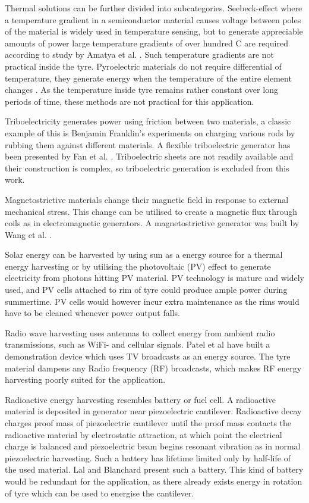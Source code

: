 Thermal solutions can be further divided into subcategories. Seebeck-effect where a temperature gradient in a semiconductor material causes voltage between poles of the material is widely used in temperature sensing, but to generate appreciable amounts of power large temperature gradients of over hundred \degree C are required according to study by Amatya et al. \cite{Amatya2010}. Such temperature gradients are not practical inside the tyre. Pyroelectric materials do not require differential of temperature, they generate energy when the temperature of the entire element changes \cite{Zhang2011}. As the temperature inside tyre remains rather constant over long periods of time, these methods are not practical for this application.

Triboelectricity generates power using friction between two materials, a classic example of this is Benjamin Franklin's experiments on charging various rods by rubbing them against different materials. A flexible triboelectric generator has been presented by Fan et al. \cite{Fan2012}. Triboelectric sheets are not readily available and their construction is complex, so triboelectric generation is excluded from this work. 

Magnetostrictive materials change their magnetic field in response to external mechanical stress. This change can be utilised to create a magnetic flux through coils as in electromagnetic generators. A magnetostrictive generator was built by Wang et al. \cite{Wang2006}. 

Solar energy can be harvested by using sun as a energy source for a thermal energy harvesting or by utilising the photovoltaic (PV) effect to generate electricity from photons hitting PV material. PV technology is mature and widely used, and PV cells attached to rim of tyre could produce ample power during summertime. PV cells would however incur extra maintenance as the rims would have to be cleaned whenever power output falls. 

Radio wave harvesting uses antennas to collect energy from ambient radio transmissions, such as WiFi- and cellular signals. Patel et al \cite{Patel2014} have built a demonstration device which uses TV broadcasts as an energy source. The tyre material dampens any Radio frequency (RF) broadcasts, which makes RF energy harvesting poorly suited for the application.

Radioactive energy harvesting resembles battery or fuel cell. A radioactive material is deposited in generator near piezoelectric cantilever. Radioactive decay charges proof mass of piezoelectric cantilever until the proof mass contacts the radioactive material by electrostatic attraction, at which point the electrical charge is balanced and piezoelectric beam begins resonant vibration as in normal piezoelectric harvesting. Such a battery has lifetime limited only by half-life of the used material. Lal and Blanchard \cite{Lal2004} present such a battery. This kind of battery would be redundant for the application, as there already exists energy in rotation of tyre which can be used to energise the cantilever. 

